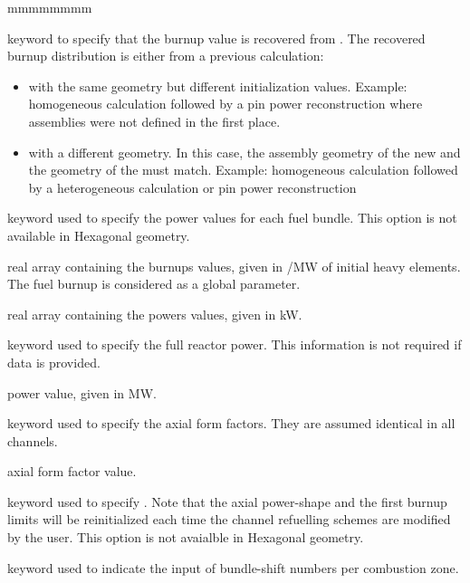 \begin{ListeDeDescription}{mmmmmmmm}
\item[\moc{OLDMAP}] keyword to specify that the burnup value is recovered from . The recovered burnup distribution is either from a previous calculation: \begin{itemize}
\item  with the same geometry but different initialization values. Example: homogeneous calculation followed by a pin power reconstruction where assemblies were not defined in the first place.
\item with a different geometry. In this case, the assembly geometry of the new  and the geometry of the  must match. Example: homogeneous calculation followed by a heterogeneous calculation or pin power reconstruction
\end{itemize}

\item[\moc{BUNDLE-POW}] keyword used to specify the power values for each fuel bundle.
This option is not available in  Hexagonal geometry.

\item[\dusa{bvalue}] real array containing the burnups values, given in
/MW of initial heavy elements. The fuel burnup
is considered as a global parameter.

\item[\dusa{pwvalue}] real array containing the powers values, given in kW.

\item[\moc{REACTOR-POW}] keyword used to specify the full reactor power. This information is not required if  data is provided.

\item[\dusa{pwtot}] power value, given in MW.

\item[\moc{AXIAL-PFORM}] keyword used to specify the axial form factors. They are assumed identical in all channels.

\item[\dusa{fvalue}] axial form factor value.

\item[\moc{REF-SHIFT}] keyword used to specify . Note that the
axial power-shape and the first burnup limits will be reinitialized each time the channel
refuelling schemes are modified by the user. This option is not avaialble in 
Hexagonal geometry.

\item[\moc{COMB}] keyword used to indicate the input of bundle-shift numbers
per combustion zone.


\end{ListeDeDescription}
